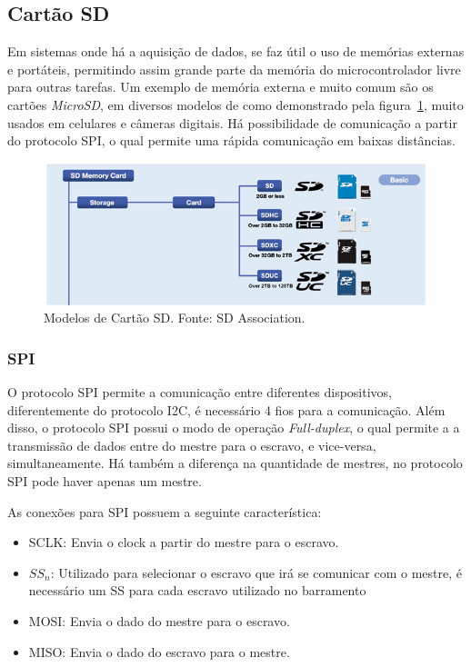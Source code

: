 \subsection{Cartão SD}

Em sistemas onde há a aquisição de dados, se faz útil o uso de memórias externas e portáteis, permitindo assim grande parte da memória do microcontrolador livre para outras tarefas. Um exemplo de memória externa e muito comum são os cartões \textit{MicroSD}, em diversos modelos de como demonstrado pela figura~\ref{fig:SD1}, muito usados em celulares e câmeras digitais. Há possibilidade de comunicação a partir do protocolo SPI, o qual permite uma rápida comunicação em baixas distâncias.

\FloatBarrier
\begin{figure}[!htbp]
	\centering
	\includegraphics[scale=0.7]{imagens/SDCARD}
	\caption{Modelos de Cartão SD. Fonte: SD Association. %
	}
	\label{fig:SD1}
\end{figure}
\FloatBarrier

\subsubsection{SPI}

O protocolo SPI permite a comunicação entre diferentes dispositivos, diferentemente do protocolo I2C, é necessário 4 fios para a comunicação. Além disso, o protocolo SPI possui o modo de operação \textit{Full-duplex}, o qual permite a a transmissão de dados entre do mestre para o escravo, e vice-versa, simultaneamente. Há também a diferença na quantidade de mestres, no protocolo SPI pode haver apenas um mestre.

As conexões para SPI possuem a seguinte característica:
\begin{itemize}
	\item SCLK: Envia o clock a partir do mestre para o escravo.
	\item $SS_n$: Utilizado para selecionar o escravo que irá se comunicar com o mestre, é necessário um SS para cada escravo utilizado no barramento 
	\item MOSI: Envia o dado do mestre para o escravo.
	\item MISO: Envia o dado do escravo para o mestre.
\end{itemize}


